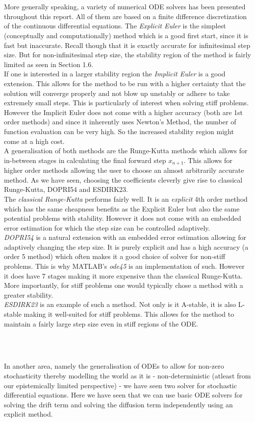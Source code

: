 \\\

More generally speaking, a variety of numerical ODE solvers has been presented throughout this report. All of them are based on a finite difference discretization of the continuous differential equations. The \textit{Explicit Euler} is the simplest (conceptually and computationally) method which is a good first start, since it is fast but inaccurate. Recall though that it is exactly accurate for infinitesimal step size. But for non-infinitesimal step size, the stability region of the method is fairly limited as seen in Section 1.6. \\
If one is interested in a larger stability region the \textit{Implicit Euler} is a good extension. This allows for the method to be run with a higher certainty that the solution will converge properly and not blow up unstably or adhere to take extremely small steps. This is particularly of interest when solving stiff problems. However the Implicit Euler does not come with a higher accuracy (both are 1st order methods) and since it inherently uses Newton's Method, the number of function evaluation can be very high. So the increased stability region might come at a high cost.
\\
A generalisation of both methods are the Runge-Kutta methods which allows for in-between stages in calculating the final forward step $x_{n+1}$. This allows for higher order methods allowing the user to choose an almost arbitrarily accurate method. As we have seen, choosing the coefficients cleverly give rise to classical Runge-Kutta, DOPRI54 and ESDIRK23.
\\
The \textit{classical Runge-Kutta} performs fairly well. It is an \textit{explicit} 4th order method which has the same cheapness benefits as the Explicit Euler but also the same potential problems with stability. However it does not come with an embedded error estimation for which the step size can be controlled adaptively.\\
\textit{DOPRI54} is a natural extension with an embedded error estimation allowing for adaptively changing the step size. It is purely explicit and has a high accuracy (a order 5 method) which often makes it a good choice of solver for non-stiff problems. This is why MATLAB's \textit{ode45} is an implementation of such. However it does have 7 stages making it more expensive than the classical Runge-Kutta. More importantly, for stiff problems one would typically chose a method with a greater stability.\\
\textit{ESDIRK23} is an example of such a method. Not only is it A-stable, it is also L-stable making it well-suited for stiff problems. This allows for the method to maintain a fairly large step size even in stiff regions of the ODE. 

\\\

In another area, namely the generalisation of ODEs to allow for non-zero stochasticity thereby modelling the world as it is - non-deterministic (atleast from our epistemically limited perspective) - we have seen two solver for stochastic differential equations. Here we have seen that we can use basic ODE solvers for solving the drift term and solving the diffusion term independently using an explicit method.